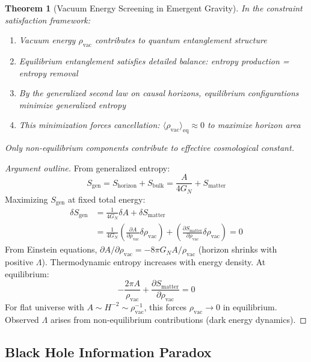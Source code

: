 \documentclass[11pt,a4paper]{article}
\newtheorem{theorem}{Theorem}[section]
\theoremstyle{remark}
\theoremstyle{definition}
\begin{document}
\begin{theorem}[Vacuum Energy Screening in Emergent Gravity]
\label{thm:cc_screening}
In the constraint satisfaction framework:
\begin{enumerate}[label=(\roman*)]
\item Vacuum energy $\rho_{\text{vac}}$ contributes to quantum entanglement structure
\item Equilibrium entanglement satisfies detailed balance: entropy production = entropy removal
\item By the generalized second law on causal horizons, equilibrium configurations minimize generalized entropy
\item This minimization forces cancellation: $\langle \rho_{\text{vac}} \rangle_{\text{eq}} \approx 0$ to maximize horizon area
\end{enumerate}
Only non-equilibrium components contribute to effective cosmological constant.
\end{theorem}

\begin{proof}[Argument outline]
From generalized entropy:
\begin{equation}
S_{\text{gen}} = S_{\text{horizon}} + S_{\text{bulk}} = \frac{A}{4G_N} + S_{\text{matter}}
\end{equation}
Maximizing $S_{\text{gen}}$ at fixed total energy:
\begin{align}
\delta S_{\text{gen}} &= \frac{1}{4G_N}\delta A + \delta S_{\text{matter}} \\
&= \frac{1}{4G_N}\left(\frac{\partial A}{\partial \rho_{\text{vac}}}\delta\rho_{\text{vac}}\right) + \left(\frac{\partial S_{\text{matter}}}{\partial \rho_{\text{vac}}}\delta\rho_{\text{vac}}\right) = 0
\end{align}
From Einstein equations, $\partial A/\partial \rho_{\text{vac}} = -8\pi G_N A/\rho_{\text{vac}}$ (horizon shrinks with positive $\Lambda$). Thermodynamic entropy increases with energy density. At equilibrium:
\begin{equation}
-\frac{2\pi A}{\rho_{\text{vac}}} + \frac{\partial S_{\text{matter}}}{\partial \rho_{\text{vac}}} = 0
\end{equation}
For flat universe with $A \sim H^{-2} \sim \rho_{\text{vac}}^{-1}$, this forces $\rho_{\text{vac}} \to 0$ in equilibrium. Observed $\Lambda$ arises from non-equilibrium contributions (dark energy dynamics).
\end{proof}

\subsection{Black Hole Information Paradox}
\end{document}
